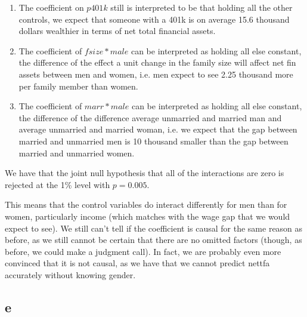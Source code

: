 \documentclass[12pt,letterpaper]{article}
\theoremstyle{definition}
\begin{document}
\begin{enumerate}
  \item The coefficient on $p401k$ still is interpreted to be that holding all the other controls, we expect that someone with a 401k is on average 15.6 thousand dollars wealthier in terms of net total financial assets.
  \item The coefficient of $fsize * male$ can be interpreted as holding all else constant, the difference of the effect a unit change in the family size will affect net fin assets between men and women, i.e. men expect to see 2.25 thousand more per family member than women.
  \item The coefficient of $marr * male$ can be interpreted as holding all else constant, the difference of the difference average unmarried and married man and average unmarried and married woman, i.e. we expect that the gap between married and unmarried men is 10 thousand smaller than the gap between married and unmarried women.
\end{enumerate}

We have that the joint null hypothesis that all of the interactions are zero is rejected at the 1\% level with $p = 0.005$.

This means that the control variables do interact differently for men than for women, particularly income (which matches with the wage gap that we would expect to see). We still can't tell if the coefficient is causal for the same reason as before, as we still cannot be certain that there are no omitted factors (though, as before, we could make a judgment call). In fact, we are probably even more convinced that it is not causal, as we have that we cannot predict nettfa accurately without knowing gender.

\subsection*{e}
\end{document}
